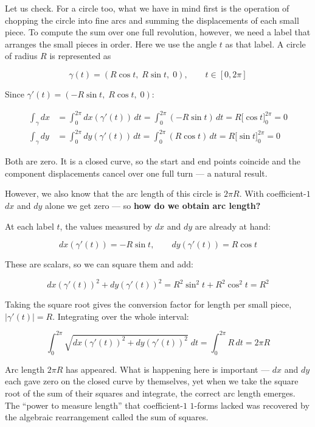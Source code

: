 \documentclass[a4paper,12pt,openany]{book}
\begin{document}
Let us check. For a circle too, what we have in mind first is the
operation of chopping the circle into fine arcs and summing the
displacements of each small piece. To compute the sum over one full
revolution, however, we need a label that arranges the small pieces in
order. Here we use the angle \(t\) as that label. A circle of radius
\(R\) is represented as

\[\gamma(t) = (R\cos t,\; R\sin t,\; 0),\qquad t \in [0, 2\pi]\]

Since \(\gamma'(t) = (-R\sin t,\; R\cos t,\; 0)\):

\[\begin{aligned}
\int_\gamma dx &= \int_0^{2\pi} dx(\gamma'(t))\,dt = \int_0^{2\pi} (-R\sin t)\,dt = R\bigl[\cos t\bigr]_0^{2\pi} = 0 \\[4pt]
\int_\gamma dy &= \int_0^{2\pi} dy(\gamma'(t))\,dt = \int_0^{2\pi} (R\cos t)\,dt = R\bigl[\sin t\bigr]_0^{2\pi} = 0
\end{aligned}\]

Both are zero. It is a closed curve, so the start and end points
coincide and the component displacements cancel over one full turn — a
natural result.

However, we also know that the arc length of this circle is \(2\pi R\).
With coefficient-\(1\) \(dx\) and \(dy\) alone we get zero — so
\textbf{how do we obtain arc length?}

At each label \(t\), the values measured by \(dx\) and \(dy\) are
already at hand:

\[
dx(\gamma'(t)) = -R\sin t,\qquad dy(\gamma'(t)) = R\cos t
\]

These are scalars, so we can square them and add:

\[dx(\gamma'(t))^2 + dy(\gamma'(t))^2 = R^2\sin^2 t + R^2\cos^2 t = R^2\]

Taking the square root gives the conversion factor for length per small
piece, \(|\gamma'(t)| = R\). Integrating over the whole interval:

\[\int_0^{2\pi} \!\sqrt{dx(\gamma'(t))^2 + dy(\gamma'(t))^2}\;dt = \int_0^{2\pi} \!R\,dt = 2\pi R\]

Arc length \(2\pi R\) has appeared. What is happening here is important
— \(dx\) and \(dy\) each gave zero on the closed curve by themselves,
yet when we take the square root of the sum of their squares and
integrate, the correct arc length emerges. The ``power to measure
length'' that coefficient-\(1\) \(1\)-forms lacked was recovered by the
algebraic rearrangement called the sum of squares.
\end{document}
